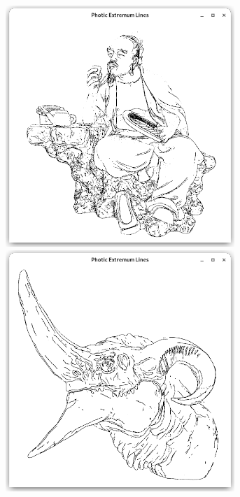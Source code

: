 \documentclass[9pt,fleqn,twoside,twocolumn]{stdglobal}
\begin{document}
\begin{figure}
\begin{subfigure}[t]{0.19\textwidth}
        \includegraphics[width=0.95\textwidth,trim={15px 15 15 50},clip]{images/results/luyu-pel.png}
        \includegraphics[width=0.95\textwidth,trim={15px 15 15 50},clip]{images/results/dragon-head-pel.png}

\end{subfigure}
\end{figure}
\end{document}
